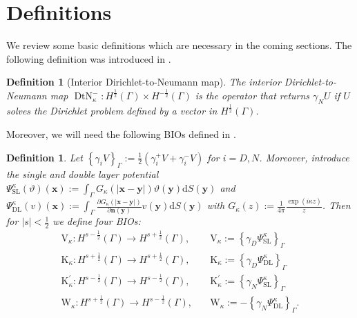 \documentclass[12pt,journal,compsoc, onecolumn]{IEEEtran}
\newtheorem{definition}[theorem]{Definition}
\begin{document}
\section{Definitions}
\label{section:definitions}
We review some basic definitions which are necessary in the coming sections.
The following definition was introduced in \cite{meury2007stable}.
\begin{definition}[Interior Dirichlet-to-Neumann map]
    The interior Dirichlet-to-Neumann map  \(\operatorname{DtN}_{\kappa}^{-}: H^{\frac{1}{2}}(\Gamma) \times H^{-\frac{1}{2}}(\Gamma)\) is the operator that returns $\gamma_NU$ if $U$ solves the Dirichlet problem defined by a vector in $ H^{\frac{1}{2}}(\Gamma)$. 
\end{definition}
\noindent
Moreover, we will need the following BIOs defined in \cite{costabel1988boundary} \cite{meury2007stable}.
\begin{definition}
Let \(\left\{\gamma_{i} V\right\}_{\Gamma}:=\frac{1}{2}\left(\gamma_{i}^{+} V+\gamma_{i}^{-} V\right)\) for $i = D, N$. Moreover, introduce the single and double layer potential \(\Psi_{\mathrm{SL}}^{\kappa}(\vartheta)(\mathbf{x}):=\int_{\Gamma} G_{\kappa}(|\mathbf{x}-\mathbf{y}|) \vartheta(\mathbf{y}) \mathrm{d} S(\mathbf{y})\) and \(\Psi_{\mathrm{DL}}^{\kappa}(v)(\mathbf{x}):=\int_{\Gamma} \frac{\partial G_{\kappa}(|\mathbf{x}-\mathbf{y}|)}{\partial \mathbf{n}(\mathbf{y})} v(\mathbf{y}) \mathrm{d} S(\mathbf{y})\) with \(G_{\kappa}(z):=\frac{1}{4 \pi} \frac{\exp (i \kappa z)}{z}\). 
Then for $|s| < \frac{1}{2}$ we define four BIOs:
\begin{align} 
\mathrm{V}_{\kappa}: H^{s-\frac{1}{2}}(\Gamma) \rightarrow H^{s+\frac{1}{2}}(\Gamma), & \quad \mathrm{V}_{\kappa}:=\left\{\gamma_{D} \Psi_{\mathrm{SL}}^{\kappa}\right\}_{\Gamma} \nonumber\\ \mathrm{K}_{\kappa}: H^{s+\frac{1}{2}}(\Gamma) \rightarrow H^{s+\frac{1}{2}}(\Gamma), & \quad \mathrm{K}_{\kappa}:=\left\{\gamma_{D} \Psi_{\mathrm{DL}}^{\kappa}\right\}_{\Gamma} \nonumber \\ \mathrm{K}_{\kappa}^{\prime}: H^{s-\frac{1}{2}}(\Gamma) \rightarrow H^{s-\frac{1}{2}}(\Gamma), & \quad \mathrm{K}_{\kappa}^{\prime}:=\left\{\gamma_{N} \Psi_{\mathrm{SL}}^{\kappa}\right\}_{\Gamma} \nonumber\\ \mathrm{W}_{\kappa}: H^{s+\frac{1}{2}}(\Gamma) \rightarrow H^{s-\frac{1}{2}}(\Gamma), & \quad \mathrm{W}_{\kappa}:=-\left\{\gamma_{N} \Psi_{\mathrm{DL}}^{\kappa}\right\}_{\Gamma}. \nonumber
\end{align}
\end{definition} 
\noindent
\end{document}
